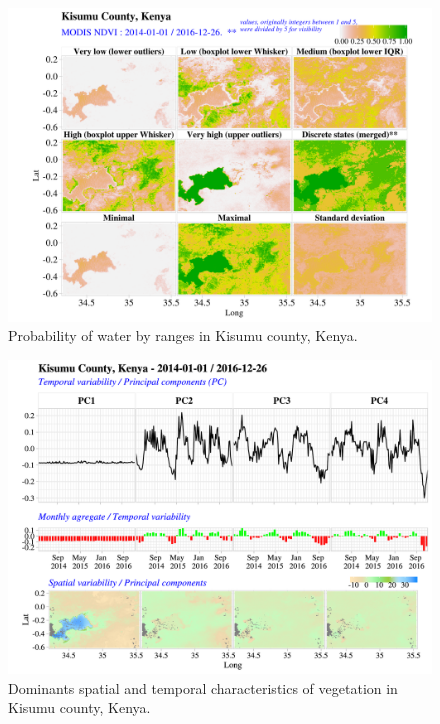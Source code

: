 \documentclass[12pt,oneside]{article}
\begin{document}
\begin{figure}
\includegraphics[width=1\linewidth]{figures/Mapping_FBFS_water_probability} \caption{Probability of water by ranges in Kisumu county, Kenya.}\label{fig:fig8}
\end{figure}

\begin{figure}
\includegraphics[width=1\linewidth]{figures/Mapping_FBFS_NDVI_PCA_plot_Kisumu} \caption{Dominants spatial and temporal characteristics of vegetation in Kisumu county, Kenya.}\label{fig:fig9}
\end{figure}
\end{document}
